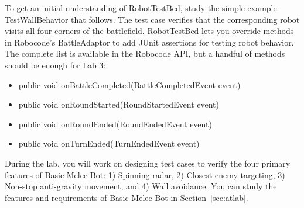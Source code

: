 \documentclass{scrreprt}
\begin{document}
To get an initial understanding of RobotTestBed, study the simple example TestWallBehavior that follows. The test case verifies that the corresponding robot visits all four corners of the battlefield. RobotTestBed lets you override methods in Robocode's BattleAdaptor to add JUnit assertions for testing robot behavior. The complete list is available in the Robocode API, but a handful of methods should be enough for Lab 3:
\begin{itemize}
\item public void onBattleCompleted(BattleCompletedEvent event)
\item public void onRoundStarted(RoundStartedEvent event)
\item public void onRoundEnded(RoundEndedEvent event)
\item public void onTurnEnded(TurnEndedEvent event)
\end{itemize}

During the lab, you will work on designing test cases to verify the four primary features of Basic Melee Bot: 1) Spinning radar, 2) Closest enemy targeting, 3) Non-stop anti-gravity movement, and 4) Wall avoidance. You can study the features and requirements of Basic Melee Bot in Section~\ref{sec:atlab}.
\end{document}
